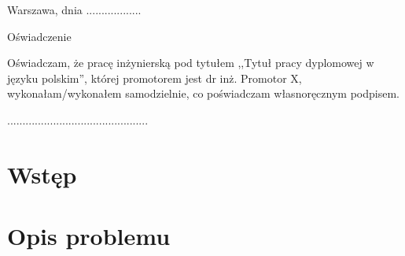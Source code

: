 \documentclass[a4paper,11pt,twoside]{report}
\theoremstyle{definition}
\newcommand{\tytul}{Tytuł pracy dyplomowej w języku polskim}
\newcommand{\type}{inżyniers} %
\newcommand{\supervisor}{dr inż. Promotor X}
\begin{document}


\null\thispagestyle{empty}\newpage

\null \hfill Warszawa, dnia ..................\\

\par\vspace{5cm}

\begin{center}
Oświadczenie
\end{center}

\indent Oświadczam, że pracę \type ką pod
tytułem ,,\tytul '', której promotorem jest \supervisor , wykonałam/wykonałem
samodzielnie, co poświadczam własnoręcznym podpisem.
\vspace{2cm}


\begin{flushright}
  \begin{minipage}{50mm}
    \begin{center}
      ..............................................

    \end{center}
  \end{minipage}
\end{flushright}

\thispagestyle{empty}
\newpage

\null\thispagestyle{empty}\newpage


\tableofcontents
\thispagestyle{empty}

\newpage %

\null\thispagestyle{empty}\newpage
\pagestyle{fancy}
\setcounter{page}{11} %

\chapter*{Wstęp}

\chapter*{Opis problemu}
\end{document}
